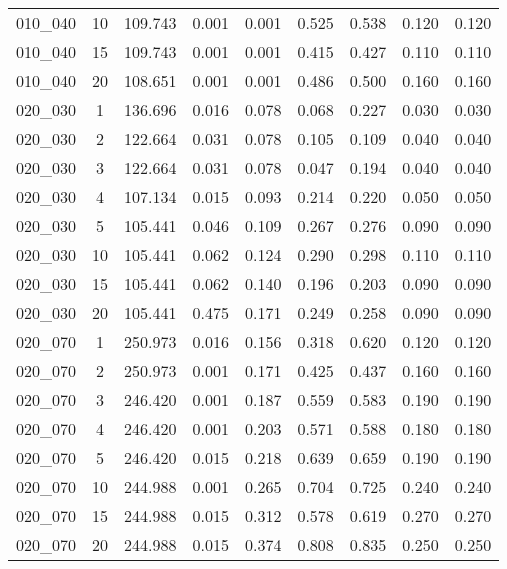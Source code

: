 \documentclass[10pt]{article}
\begin{document}
\begin{table}[H]
\begin{tabular}{ccc|cc|cc|cc}
{010\_040} & {10} & {109.743} & {0.001} & {0.001} & {0.525} & {0.538} & {0.120} & {0.120}\tabularnewline
{010\_040} & {15} & {109.743} & {0.001} & {0.001} & {0.415} & {0.427} & {0.110} & {0.110}\tabularnewline
{010\_040} & {20} & {108.651} & {0.001} & {0.001} & {0.486} & {0.500} & {0.160} & {0.160}\tabularnewline
\hline 
{020\_030} & {1} & {136.696} & {0.016} & {0.078} & {0.068} & {0.227} & {0.030} & {0.030}\tabularnewline
{020\_030} & {2} & {122.664} & {0.031} & {0.078} & {0.105} & {0.109} & {0.040} & {0.040}\tabularnewline
{020\_030} & {3} & {122.664} & {0.031} & {0.078} & {0.047} & {0.194} & {0.040} & {0.040}\tabularnewline
{020\_030} & {4} & {107.134} & {0.015} & {0.093} & {0.214} & {0.220} & {0.050} & {0.050}\tabularnewline
{020\_030} & {5} & {105.441} & {0.046} & {0.109} & {0.267} & {0.276} & {0.090} & {0.090}\tabularnewline
{020\_030} & {10} & {105.441} & {0.062} & {0.124} & {0.290} & {0.298} & {0.110} & {0.110}\tabularnewline
{020\_030} & {15} & {105.441} & {0.062} & {0.140} & {0.196} & {0.203} & {0.090} & {0.090}\tabularnewline
{020\_030} & {20} & {105.441} & {0.475} & {0.171} & {0.249} & {0.258} & {0.090} & {0.090}\tabularnewline
\hline 
{020\_070} & {1} & {250.973} & {0.016} & {0.156} & {0.318} & {0.620} & {0.120} & {0.120}\tabularnewline
{020\_070} & {2} & {250.973} & {0.001} & {0.171} & {0.425} & {0.437} & {0.160} & {0.160}\tabularnewline
{020\_070} & {3} & {246.420} & {0.001} & {0.187} & {0.559} & {0.583} & {0.190} & {0.190}\tabularnewline
{020\_070} & {4} & {246.420} & {0.001} & {0.203} & {0.571} & {0.588} & {0.180} & {0.180}\tabularnewline
{020\_070} & {5} & {246.420} & {0.015} & {0.218} & {0.639} & {0.659} & {0.190} & {0.190}\tabularnewline
{020\_070} & {10} & {244.988} & {0.001} & {0.265} & {0.704} & {0.725} & {0.240} & {0.240}\tabularnewline
{020\_070} & {15} & {244.988} & {0.015} & {0.312} & {0.578} & {0.619} & {0.270} & {0.270}\tabularnewline
{020\_070} & {20} & {244.988} & {0.015} & {0.374} & {0.808} & {0.835} & {0.250} & {0.250}\tabularnewline
\hline 
\end{tabular}
\end{table}
\end{document}
